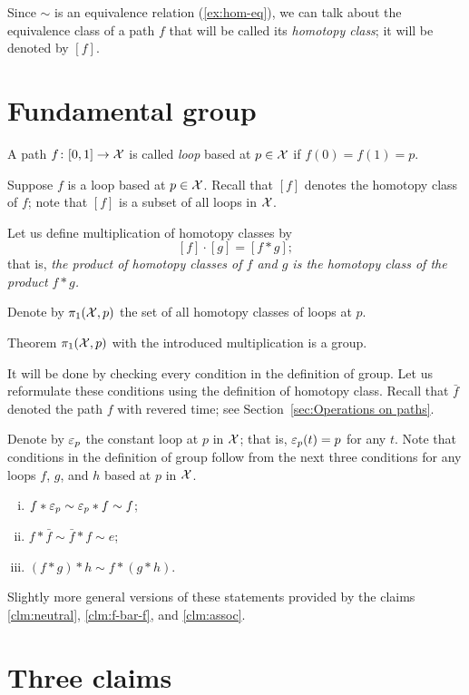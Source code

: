 Since $\sim$ is an equivalence relation (\ref{ex:hom-eq}), we can talk about the equivalence class of a path $f$ that will be called its \emph{homotopy class};
it will be denoted by $[f]$.

\section{Fundamental group}

A path $f\colon[0,1]\to\mathcal{X}$ is called \emph{loop} based at $p\in\mathcal{X}$ if $f(0)=f(1)=p$.

Suppose $f$ is a loop based at $p\in \mathcal{X}$.
Recall that $[f]$ denotes the homotopy class of $f$; 
note that $[f]$ is a subset of all loops in $\mathcal{X}$.

Let us define multiplication of homotopy classes by 
\[[f]\cdot [g]=[f*g];\]
that is, \textit{the product of homotopy classes of $f$ and $g$ is the homotopy class of the product $f*g$.}

Denote by $\pi_1(\mathcal{X},p)$ the set of all homotopy classes of loops at $p$.

\begin{thm}{Theorem}
 $\pi_1(\mathcal{X},p)$ with the introduced multiplication is a group.
\end{thm}

It will be done by checking every condition in the definition of group.
Let us reformulate these conditions using the definition of homotopy class.
Recall that $\bar f$ denoted the path $f$ with revered time; see Section~\ref{sec:Operations on paths}.

Denote by $\varepsilon_p$ the constant loop at $p$ in $\mathcal{X}$;
that is, $\varepsilon_p(t)=p$ for any $t$.
Note that conditions in the definition of group follow from the next three conditions for any loops $f$, $g$, and $h$ based at $p$ in $\mathcal{X}$.
\begin{enumerate}[(i)]
\item $f*\varepsilon_p\sim \varepsilon_p*f\sim f$;
\item $f*\bar f\sim\bar f* f\sim e$;
\item $(f*g)*h\sim f*(g*h)$.
\end{enumerate}
Slightly more general versions of these statements provided by the claims \ref{clm:neutral}, \ref{clm:f-bar-f}, and \ref{clm:assoc}.
\qeds

\section{Three claims}

